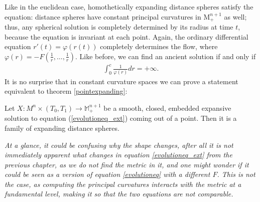 Like in the euclidean case, homothetically expanding distance spheres satisfy the equation: distance spheres have constant principal curvatures in $\mathrm{M}^{n+1}_+$ as well; thus, any spherical solution is completely determined by its radius at time $t$, because the equation is invariant at each point. Again, the ordinary differential equation $r'(t) = \varphi(r(t))$ completely determines the flow, where $\varphi(r) = -F(\frac{1}{r}, \dots, \frac{1}{r})$. Like before, we can find an ancient solution if and only if
\begin{align*}
	\int_{0}^{c}\frac{1}{\varphi(r)} dr =+\infty.
\end{align*}
It is no surprise that in constant curvature spaces we can prove a statement equivalent to theorem \ref{pointexpanding}:

\begin{theorem}
	Let $ X : M^n \times (T_0, T_1) \to \mathbb{M}^{n+1}_+ $ be a smooth, closed, embedded expansive solution to equation (\ref{evolutioneq_ext}) coming out of a point. Then it is a family of expanding distance spheres. \label{expandingflowext}
\end{theorem}
\begin{oss}\em
	At a glance, it could be confusing why the shape changes, after all it is not immediately apparent what changes in equation  	\ref{evolutioneq_ext} from the previous chapter, as we do not find the metric in it, and one might wonder if it could be seen as a version of equation  \ref{evolutioneq} with a different $F$. This is not the case, as computing the principal curvatures interacts with the metric at a fundamental level, making it so that the two equations are not comparable.
\end{oss}

